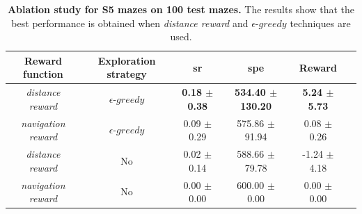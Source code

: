\begin{table}
    \centering
    \begin{tabular}{c c c c c c}
        \toprule
        Reward function            & Exploration strategy     & \acrshort{sr}            & \acrshort{spe}               & Reward                   \\
        \midrule
        \textit{distance reward}   & $\epsilon\text{-}greedy$ & \textbf{0.18 $\pm$ 0.38} & \textbf{534.40 $\pm$ 130.20} & \textbf{5.24 $\pm$ 5.73} \\
        \textit{navigation reward} & $\epsilon\text{-}greedy$ & 0.09 $\pm$ 0.29          & 575.86 $\pm$ 91.94           & 0.08 $\pm$ 0.26          \\
        \textit{distance reward}   & No                       & 0.02 $\pm$ 0.14          & 588.66 $\pm$ 79.78           & -1.24 $\pm$ 4.18         \\
        \textit{navigation reward} & No                       & 0.00 $\pm$ 0.00          & 600.00 $\pm$ 0.00            & 0.00 $\pm$ 0.00          \\
        \bottomrule
    \end{tabular}
    \caption[Ablation study for S5 mazes on 100 test mazes]{\textbf{Ablation study for S5 mazes on 100 test mazes.} The results show that the best performance is obtained when \textit{distance reward} and $\epsilon\text{-}greedy$ techniques are used.}
    \label{tab:ablation-study}
\end{table}

